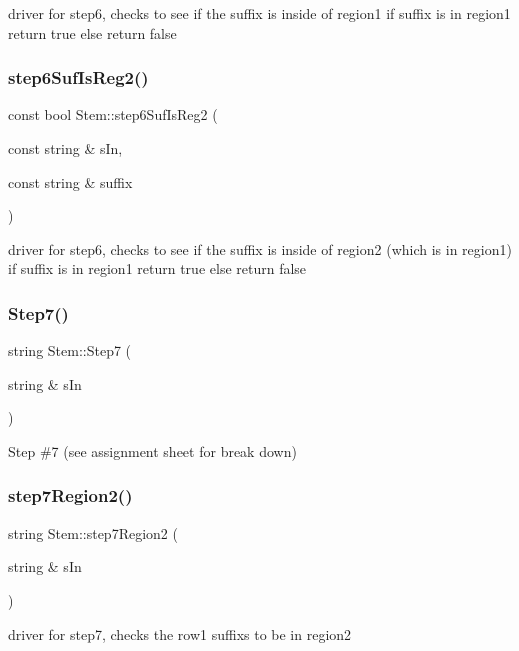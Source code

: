driver for step6, checks to see if the suffix is inside of region1 if suffix is in region1 return true else return false \mbox{\label{class_stem_adc4753b96d823602c46699613196cd28}} 
\subsubsection{\texorpdfstring{step6\+Suf\+Is\+Reg2()}{step6SufIsReg2()}}
{\footnotesize\ttfamily const bool Stem\+::step6\+Suf\+Is\+Reg2 (\begin{DoxyParamCaption}\item[{const string \&}]{s\+In,  }\item[{const string \&}]{suffix }\end{DoxyParamCaption})}

driver for step6, checks to see if the suffix is inside of region2 (which is in region1) if suffix is in region1 return true else return false \mbox{\label{class_stem_a02934d9655b34dd4fb7d702359d01f32}} 
\subsubsection{\texorpdfstring{Step7()}{Step7()}}
{\footnotesize\ttfamily string Stem\+::\+Step7 (\begin{DoxyParamCaption}\item[{string \&}]{s\+In }\end{DoxyParamCaption})}

Step \#7 (see assignment sheet for break down) \mbox{\label{class_stem_a1833c97aaa729ef6e21ee9d53972bec2}} 
\subsubsection{\texorpdfstring{step7\+Region2()}{step7Region2()}}
{\footnotesize\ttfamily string Stem\+::step7\+Region2 (\begin{DoxyParamCaption}\item[{string \&}]{s\+In }\end{DoxyParamCaption})}

driver for step7, checks the row1 suffixs to be in region2 \mbox{\label{class_stem_a01a72f854d2b3846153560b2edd9d71f}} 
